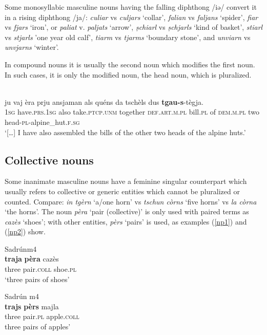 Some monosyllabic masculine nouns having the falling diphthong /iə/ convert it in a rising diphthong /ja/: \textit{culiar} vs \textit{culjars} `collar', \textit{falian} vs \textit{faljans} `spider', \textit{fiar} vs \textit{fjars} `iron', or \textit{paliat} v. \textit{paljats} `arrow', \textit{ṣchiarl} vs \textit{ṣchjarls} `kind of basket', \textit{stiarl} vs \textit{stjarls} 'one year old calf', \textit{tiarm} vs \textit{tjarms} `boundary stone', and \textit{unviarn} vs \textit{unvjarns} `winter'.

In compound nouns it is usually the second noun which modifies the first noun. In such cases, it is only the modified noun, the head noun, which is pluralized.


\ea\label{ex: }
\\
\gll  […] ju vaj\footnotemark{} èra prju ansjaman als quéns da tschèls dus \textbf{tgau}\textbf{-s}-tègja.  \\
    {} \textsc{1sg} have.\textsc{prs.1sg} also take.\textsc{ptcp.unm} together \textsc{def.art.m.pl} bill.\textsc{pl} of \textsc{dem.m.pl} two head-\textsc{pl}-alpine\_hut.\textsc{f.sg} \\
\glt `[…] I have also assembled the bills of the other two heads of the alpine huts.'
\z

\subsection{Collective nouns}
Some inanimate masculine nouns have a feminine singular counterpart which usually refers to collective or generic entities which cannot be pluralized or counted. Compare: \textit{ in tgèrn} `a/one horn’ vs \textit{tschun còrns} `five horns’ vs \textit{la còrna} `the horns’. The noun \textit{pèra} `pair (collective)' is only used with paired terms as \textit{cazès} `shoes'; with other entities, \textit{pèrs} `pairs' is used, as examples (\ref{np1}) and (\ref{np2}) show. 

\ea\label{np1}
 {Sadrún}{m4}\\
\gll    \textbf{traja} \textbf{pèra} cazès \\
three pair.\textsc{coll} shoe.\textsc{pl}\\
\glt `three pairs of shoes'
\z

\ea\label{np2}
 {Sadrún} {m4}\\
\gll    \textbf{trajs} \textbf{pèrs} majla\\
three pair.\textsc{pl} apple.\textsc{coll}\\
\glt  three pairs of apples'
\z

